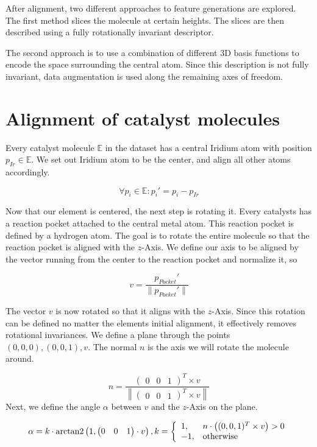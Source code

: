 After alignment, two different approaches to feature generations are explored.
The first method slices the molecule at certain heights.
The slices are then described using a fully rotationally invariant descriptor.

The second approach is to use a combination of different 3D basis functions to encode the space surrounding the central atom.
Since this description is not fully invariant, data augmentation is used along the remaining axes of freedom.

\section{Alignment of catalyst molecules}

Every catalyst molecule $\mathbb{E}$ in the dataset has a central Iridium atom with position $p_{Ir} \in \mathbb{E}$.
We set out Iridium atom to be the center, and align all other atoms accordingly.

$$ \forall p_i \in \mathbb{E}: p_i' = p_i - p_{Ir}$$

Now that our element is centered, the next step is rotating it.
Every catalysts has a reaction pocket attached to the central metal atom.
This reaction pocket is defined by a hydrogen atom.
The goal is to rotate the entire molecule so that the reaction pocket is aligned with the $z$-Axis.
We define our axis to be aligned by the vector running from the center to the reaction pocket and normalize it, so

$$ v = \frac{p_{Pocket}'}{\| p_{Pocket}'\| } $$

The vector $v$ is now rotated so that it aligns with the $z$-Axis.
Since this rotation can be defined no matter the elements initial alignment, it effectively removes rotational invariances.
We define a plane through the points $(0,0,0), (0,0,1), v$.
The normal $n$ is the axis we will rotate the molecule around.

$$
n =\frac{\begin{pmatrix}
  0 &
  0 &
  1
\end{pmatrix}^T \times v}{ \left\| \begin{pmatrix}
  0 &
  0 &
  1
\end{pmatrix}^T \times v \right\| }
$$
Next, we define the angle $\alpha$ between $v$ and the $z$-Axis on the plane.

$$ 
\alpha = k \cdot \operatorname{arctan2} \left( 1,  
\begin{pmatrix} 0 &  0 & 1 \end{pmatrix} \cdot v \right),\space k = \left\{\begin{array}{ll} 1, & n \cdot \left( (0,0,1)^T \times v \right) > 0 \\
  -1, & \text{otherwise}\end{array}\right.
$$

